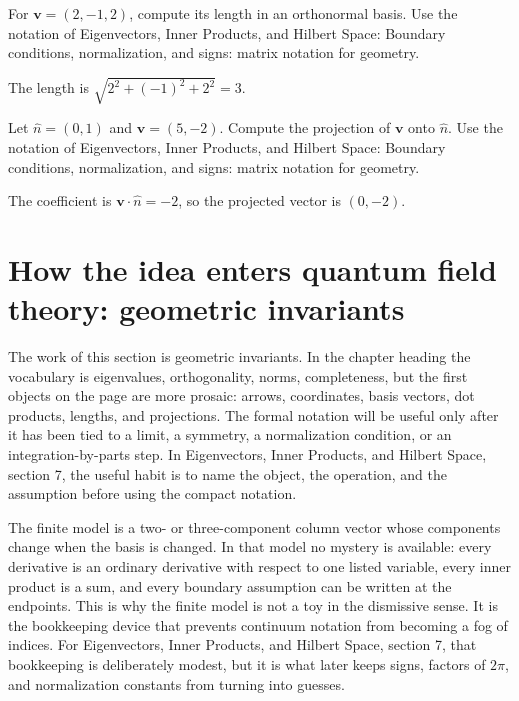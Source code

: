 \begin{exercise}
For \(\bm v=(2,-1,2)\), compute its length in an orthonormal basis.  Use the notation of Eigenvectors, Inner Products, and Hilbert Space: Boundary conditions, normalization, and signs: matrix notation for geometry.
\begin{answer}
The length is \(\sqrt{2^2+(-1)^2+2^2}=3\).
\end{answer}
\end{exercise}

\begin{exercise}
Let \(\hat n=(0,1)\) and \(\bm v=(5,-2)\).  Compute the projection of \(\bm v\) onto \(\hat n\).  Use the notation of Eigenvectors, Inner Products, and Hilbert Space: Boundary conditions, normalization, and signs: matrix notation for geometry.
\begin{answer}
The coefficient is \(\bm v\cdot\hat n=-2\), so the projected vector is \((0,-2)\).
\end{answer}
\end{exercise}



\section{How the idea enters quantum field theory: geometric invariants}

The work of this section is geometric invariants.  In the chapter heading the vocabulary is eigenvalues, orthogonality, norms, completeness, but the first objects on the page are more prosaic: arrows, coordinates, basis vectors, dot products, lengths, and projections.  The formal notation will be useful only after it has been tied to a limit, a symmetry, a normalization condition, or an integration-by-parts step.  In Eigenvectors, Inner Products, and Hilbert Space, section 7, the useful habit is to name the object, the operation, and the assumption before using the compact notation.

The finite model is a two- or three-component column vector whose components change when the basis is changed.  In that model no mystery is available: every derivative is an ordinary derivative with respect to one listed variable, every inner product is a sum, and every boundary assumption can be written at the endpoints.  This is why the finite model is not a toy in the dismissive sense.  It is the bookkeeping device that prevents continuum notation from becoming a fog of indices.  For Eigenvectors, Inner Products, and Hilbert Space, section 7, that bookkeeping is deliberately modest, but it is what later keeps signs, factors of \(2\pi\), and normalization constants from turning into guesses.

